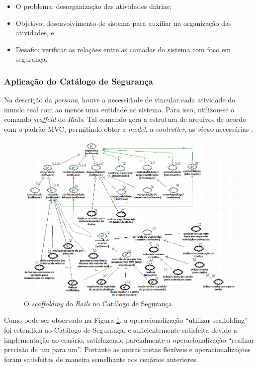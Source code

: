 \begin{itemize}
	\item O problema: desorganização das atividades diárias;
	\item Objetivo: desenvolvimento de sistema para auxiliar na organização das atividades, e
	\item Desafio: verificar as relações entre as camadas do sistema com foco em segurança.
\end{itemize}


\subsubsection{Aplicação do Catálogo de Segurança}

Na descrição da \textit{persona}, houve a necessidade de vincular cada atividade do mundo real com ao menos uma entidade no sistema. Para isso, utilizou-se o comando \textit{scaffold} do \textit{Rails}. Tal comando gera a estrutura de arquivos de acordo com o padrão MVC, permitindo obter a \textit{model}, a \textit{controller}, as \textit{views} necessárias \cite{railscommunity}. 

\begin{figure}[h!]
	\centering
	\includegraphics[keepaspectratio=true,scale=0.7]{figuras/catalogoPersona3.PNG}
	\caption{O \textit{scaffolding} do \textit{Rails} no Catálogo de Segurança.}
	\label{catalogoPersona3}
\end{figure}

Como pode ser observado na Figura \ref{catalogoPersona3}, a operacionalização “utilizar scaffolding” foi estendida ao Catálogo de Segurança, e suficientemente satisfeita devido a implementação ao cenário, satisfazendo parcialmente a operacionalização  “realizar precisão de um para um”. Portanto as outras metas flexíveis e operacionalizações foram satisfeitas de maneira semelhante aos cenários anteriores. 

